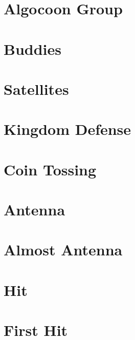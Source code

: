 \documentclass[a4paper, 10pt]{article}
\let\stdsection\section
\renewcommand\section{\newpage\stdsection}
\newcommand{\includecode}[1]{
    }
\newcommand{\algoAuthor}{2} %
\begin{document}
    
    \section{Algocoon Group}
        \includecode{../problems/w05/Algocoon/Algocoon\algoAuthor.cpp}
        
    \section{Buddies}
        \includecode{../problems/w05/Buddies/Buddies\algoAuthor.cpp}
        
    \section{Satellites}
        \includecode{../problems/w05/Satellites/Satellites\algoAuthor.cpp}
        
    \section{Kingdom Defense}
        \includecode{../problems/w05/Kingdom_Defense/KingdomDefense\algoAuthor.cpp}
    
    \section{Coin Tossing}
        \includecode{../problems/w05/Coin_Tossing/CoinTossing\algoAuthor.cpp}
          

    \section{Antenna}
        \includecode{../problems/w06/Antenna/Antenna\algoAuthor.cpp}
        
    \section{Almost Antenna}
        \includecode{../problems/w06/AlmostAntenna/AlmostAntenna\algoAuthor.cpp}
        
    \section{Hit}
        \includecode{../problems/w06/Hit/Hit\algoAuthor.cpp}
        
    \section{First Hit}
        \includecode{../problems/w06/FirstHit/FirstHit\algoAuthor.cpp}
    
\end{document}
